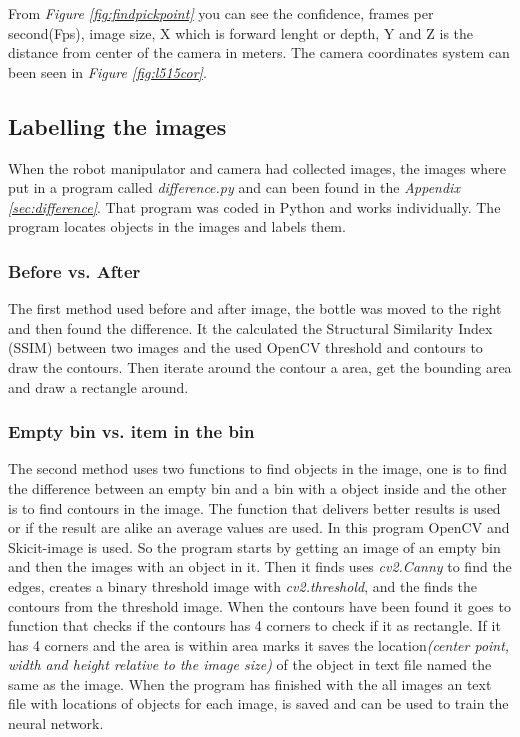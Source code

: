 From \textit{Figure \ref{fig:findpickpoint}} you can see the confidence, frames per second(Fps), image size, X which is forward lenght or depth, Y and Z is the distance from center of the camera in meters. 
The camera coordinates system can been seen in \textit{Figure \ref{fig:l515cor}}.


\subsection{Labelling the images}\label{labelimg}
When the robot manipulator and camera had collected images, the images where put in a program called \textit{difference.py} and can been found in the \textit{Appendix \ref{sec:difference}}. That program was coded in Python and works individually. The program locates objects in the images and labels them. 


\subsubsection*{Before vs. After}
The first method used before and after image, the bottle was moved to the right and then found the difference. It the calculated the Structural Similarity Index (SSIM) between two images and the used OpenCV threshold and contours to draw the contours. Then iterate around the contour a area, get the bounding area and draw a rectangle around. 
\subsubsection*{Empty bin vs. item in the bin}
The second method uses two functions to find objects in the image, one is to find the difference between an empty bin and a bin with a object inside and the other is to find contours in the image. 
The function that delivers better results is used or if the result are alike an average values are used. 
In this program OpenCV and Skicit-image is used. 
So the program starts by getting an image of an empty bin and then the images with an object in it. 
Then it finds uses \textit{cv2.Canny} to find the edges, creates a binary threshold image with \textit{cv2.threshold}, and the finds the contours from the threshold image.  
When the contours have been found it goes to function that checks if the contours has 4 corners to check if it as rectangle. 
If it has 4 corners and the area is within area marks it saves the location\textit{(center point, width and height relative to the image size)} of the object in text file named the same as the image. 
When the program has finished with the all images an text file with locations of objects for each image, is saved and can be used to train the neural network.

